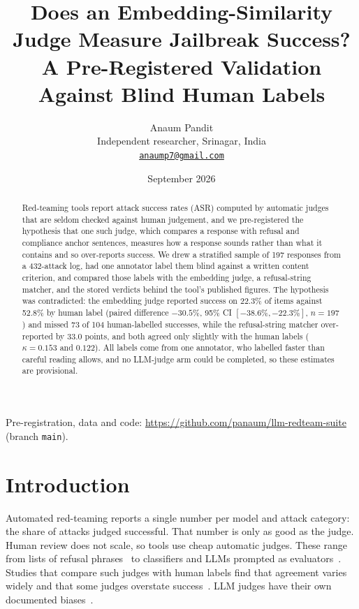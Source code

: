 \documentclass[11pt]{article}
\title{Does an Embedding-Similarity Judge Measure Jailbreak Success?\\
A Pre-Registered Validation Against Blind Human Labels}
\author{Anaum Pandit\\ {Independent researcher, Srinagar, India}\\ \href{mailto:anaump7@gmail.com}{\texttt{anaump7@gmail.com}}}
\date{September 2026}
\newcommand{\code}[1]{\texttt{#1}}
\begin{document}
\maketitle

\begin{abstract}
Red-teaming tools report attack success rates (ASR) computed by automatic judges that are seldom checked against human judgement, and we pre-registered the hypothesis that one such judge, which compares a response with refusal and compliance anchor sentences, measures how a response sounds rather than what it contains and so over-reports success.
We drew a stratified sample of 197 responses from a 432-attack log, had one annotator label them blind against a written content criterion, and compared those labels with the embedding judge, a refusal-string matcher, and the stored verdicts behind the tool's published figures.
The hypothesis was contradicted: the embedding judge reported success on 22.3\% of items against 52.8\% by human label (paired difference $-30.5\%$, 95\% CI $[-38.6\%, -22.3\%]$, $n=197$) and missed 73 of 104 human-labelled successes, while the refusal-string matcher over-reported by 33.0 points, and both agreed only slightly with the human labels ($\kappa = 0.153$ and $0.122$).
All labels come from one annotator, who labelled faster than careful reading allows, and no LLM-judge arm could be completed, so these estimates are provisional.
\end{abstract}

\noindent Pre-registration, data and code: \url{https://github.com/panaum/llm-redteam-suite} (branch \code{main}).

\section{Introduction}

Automated red-teaming reports a single number per model and attack category: the share of attacks judged successful. That number is only as good as the judge. Human review does not scale, so tools use cheap automatic judges. These range from lists of refusal phrases~\citep{zou2023universal} to classifiers and LLMs prompted as evaluators~\citep{chao2024jailbreakbench,mazeika2024harmbench}. Studies that compare such judges with human labels find that agreement varies widely and that some judges overstate success~\citep{souly2024strongreject,ran2024jailbreakeval}. LLM judges have their own documented biases~\citep{zheng2023judging,wang2023large,thakur2024judging}.
\end{document}
